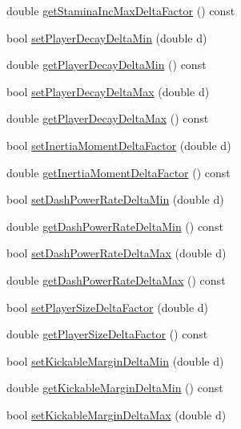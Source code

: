 \begin{DoxyCompactItemize}
double \hyperlink{classServerSettings_a74cd1e116075a58d218dc802943e4071}{get\+Stamina\+Inc\+Max\+Delta\+Factor} () const 
\item 
bool \hyperlink{classServerSettings_a6d7e9f12ce219523ac94a547a06c8330}{set\+Player\+Decay\+Delta\+Min} (double d)
\item 
double \hyperlink{classServerSettings_a5b4d8a4bb803df8428d89e01a64e1bfb}{get\+Player\+Decay\+Delta\+Min} () const 
\item 
bool \hyperlink{classServerSettings_a103639801cc6c13662ec4e0b6ed0ec0b}{set\+Player\+Decay\+Delta\+Max} (double d)
\item 
double \hyperlink{classServerSettings_affdfc06e62a638d64ffc95c3fd559a9d}{get\+Player\+Decay\+Delta\+Max} () const 
\item 
bool \hyperlink{classServerSettings_aed5d249aea08850f0f0aef19efec9ce3}{set\+Inertia\+Moment\+Delta\+Factor} (double d)
\item 
double \hyperlink{classServerSettings_a6da6f800cc36c70ec191f239a8818b87}{get\+Inertia\+Moment\+Delta\+Factor} () const 
\item 
bool \hyperlink{classServerSettings_ade566764abe2366ff29acd6eb2a97676}{set\+Dash\+Power\+Rate\+Delta\+Min} (double d)
\item 
double \hyperlink{classServerSettings_aa2b26db481ea52080318a0045aed14bd}{get\+Dash\+Power\+Rate\+Delta\+Min} () const 
\item 
bool \hyperlink{classServerSettings_a05731d8156482a76b800ef242341d49a}{set\+Dash\+Power\+Rate\+Delta\+Max} (double d)
\item 
double \hyperlink{classServerSettings_ae561ab94c78a5df974269f757008d140}{get\+Dash\+Power\+Rate\+Delta\+Max} () const 
\item 
bool \hyperlink{classServerSettings_ac7ae5d47d3763512df27a7ae0e6eac5d}{set\+Player\+Size\+Delta\+Factor} (double d)
\item 
double \hyperlink{classServerSettings_a8913804089359b0dd41d5bef87330995}{get\+Player\+Size\+Delta\+Factor} () const 
\item 
bool \hyperlink{classServerSettings_a6ae37cf80edc57f457f7d946b3c91638}{set\+Kickable\+Margin\+Delta\+Min} (double d)
\item 
double \hyperlink{classServerSettings_a7a055d4565837966f2d278d2b1dbc988}{get\+Kickable\+Margin\+Delta\+Min} () const 
\item 
bool \hyperlink{classServerSettings_a99d5f31b575c976b289a5a0e7a185b24}{set\+Kickable\+Margin\+Delta\+Max} (double d)
\item 

\end{DoxyCompactItemize}
